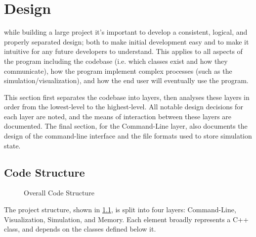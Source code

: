 
\chapter{Design}
\label{sec:Design} 

while building a large project it's important to develop a consistent, logical, and properly separated design; both to make initial development easy and to make it intuitive for any future developers to understand.
This applies to all aspects of the program including the codebase (i.e. which classes exist and how they communicate), how the program implement complex processes (such as the simulation/visualization), and how the end user will eventually use the program.

This section first separates the codebase into layers, then analyses these layers in order from the lowest-level to the highest-level.
All notable design decisions for each layer are noted, and the means of interaction between these layers are documented.
The final section, for the Command-Line layer, also documents the design of the command-line interface and the file formats used to store simulation state.


\section{Code Structure}
\begin{figure}
    \centering
    \caption{Overall Code Structure}
    \label{fig:designstructure}
\end{figure}
The project structure, shown in \cref{fig:designstructure}, is split into four layers: Command-Line, Visualization, Simulation, and Memory.
Each element broadly represents a C++ class, and depends on the classes defined below it.

